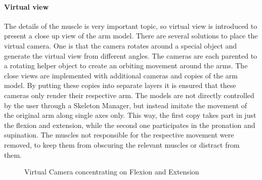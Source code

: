 \paragraph{Virtual view}
The details of the muscle is very important topic, so virtual view is introduced to present a close up view of the arm model. There are several solutions to place the virtual camera. One is that the camera rotates around a special object and generate the virtual view from different angles. The cameras are each parented to a rotating helper object to create an orbiting movement around the arms. 
The close views are implemented with additional cameras and copies of the arm model. By putting these copies into separate layers it is ensured that these cameras only render their respective arm. The models are not directly controlled by the user through a Skeleton Manager, but instead imitate the movement of the original arm along single axes only. This way, the first copy takes part in just the flexion and extension, while the second one participates in the pronation and supination. The muscles not responsible for the respective movement were removed, to keep them from obscuring the relevant muscles or distract from them.
\begin{figure}
	\centering
	
	\caption{Virtual Camera concentrating on Flexion and Extension}
	\label{fig:3-IMR:MuscleLearningVirtualCamera}
\end{figure}

